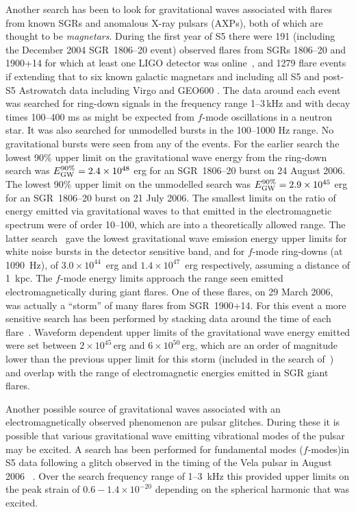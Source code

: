 \documentclass{article}
\begin{document}
Another search has been to look for gravitational waves associated with flares
from known SGRs and anomalous X-ray pulsars (AXPs), both of which are thought to
be \textit{magnetars}. During the first year of S5 there were 191 (including the
December 2004 SGR~1806--20 event) observed flares from SGRs 1806--20 and
1900+14 for which at least one LIGO detector was online~\cite{Abbott:2008h}, and
1279 flare events if extending that to six known galactic magnetars and
including all S5 and post-S5 Astrowatch data including Virgo and GEO600
\cite{Abadie:2010c}. The data around each event was searched for ring-down
signals in the frequency range 1--3\,kHz and with decay times 100--400 ms as
might be expected from $f$-mode oscillations in a neutron star. It was also
searched for unmodelled bursts in the 100--1000 Hz range. No gravitational
bursts were seen from any of the events. For the earlier search
\cite{Abbott:2008h} the lowest 90\% upper limit on the gravitational wave energy
from the ring-down search was $E_{\rm GW}^{90\%} = 2.4\times10^{48}$ erg for an
SGR~1806--20 burst on 24 August 2006. The lowest 90\% upper limit on the
unmodelled search was $E_{\rm GW}^{90\%} = 2.9\times10^{45}$ erg for
an SGR~1806--20 burst on 21 July 2006. The smallest limits on the ratio
of energy emitted via gravitational waves to that emitted in the
electromagnetic spectrum were of order 10--100, which are into a
theoretically allowed range. The latter search~\cite{Abadie:2010c}
gave the lowest gravitational wave emission energy upper limits for
white noise bursts in the detector sensitive band, and for $f$-mode
ring-downs (at 1090~Hz), of $3.0\times10^{44}$~erg and
$1.4\times10^{47}$~erg respectively, assuming a distance of 1~kpc. The
$f$-mode energy limits approach the range seen emitted
electromagnetically during giant flares. One of these flares, on 29
March 2006, was actually a ``storm'' of many flares from
SGR~1900+14. For this event a more sensitive search has been
performed by stacking data around the time of each
flare~\cite{Abbott:2009c}. Waveform dependent upper limits of the
gravitational wave energy emitted were set between
$2\times10^{45}$\,erg and $6\times10^{50}$\,erg, which are an order of
magnitude lower than the previous upper limit for this storm (included
in the search of~\cite{Abbott:2008h}) and overlap with the range of
electromagnetic energies emitted in SGR giant flares.

Another possible source of gravitational waves associated with an
electromagnetically observed phenomenon are pulsar glitches. During these it is
possible that various gravitational wave emitting vibrational modes of the
pulsar may be excited. A search has been performed for fundamental modes
($f$-modes)in S5 data following a glitch observed in the timing of the Vela
pulsar in August 2006 ~\cite{Abadie:2010a}. Over the search frequency range
of 1--3~kHz this provided upper limits on the peak strain of
$0.6-1.4\times10^{-20}$ depending on the spherical harmonic that was excited.
\end{document}
